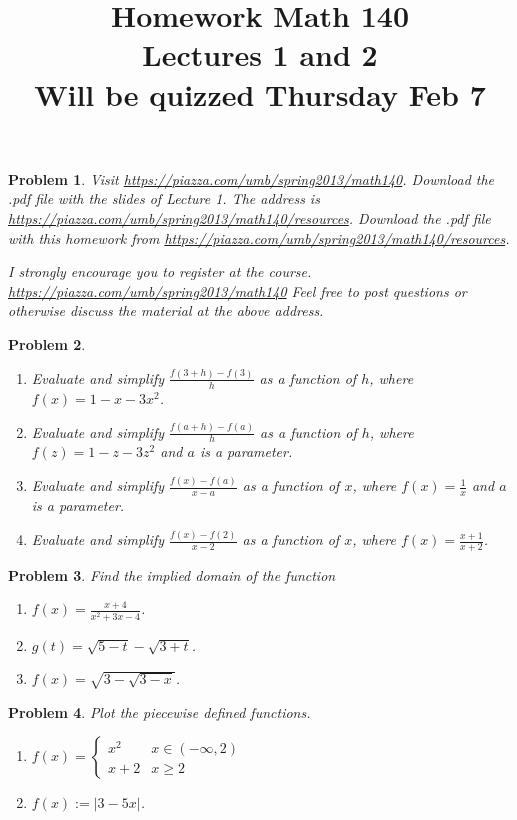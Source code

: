 \documentclass{article}
\date{}
\title{
Homework Math 140 \\
Lectures 1 and 2 \\
Will be quizzed Thursday Feb 7
}
\newcommand{\doublebrace}[4]{\left\{\begin{array}{ll} #1 & #2 \\#3 & #4  \end{array} \right.}
\newtheorem{problem}{Problem}
\begin{document}
\maketitle
\begin{problem}
Visit \url{https://piazza.com/umb/spring2013/math140}. Download the .pdf file with the slides of Lecture 1. The address is 
\url{https://piazza.com/umb/spring2013/math140/resources}. Download the .pdf file with this homework from 
\url{https://piazza.com/umb/spring2013/math140/resources}. 

I strongly encourage you to register at the course. 
\url{https://piazza.com/umb/spring2013/math140}
Feel free to post questions or otherwise discuss the material at the above address.
\end{problem}

\begin{problem}
\begin{enumerate}
\item Evaluate and simplify $\frac{f(3+h)-f(3)}{h}$ as a function of $h$, where $f(x)= 1-x-3x^2$. 
\item Evaluate and simplify $\frac{f(a+h)-f(a)}{h}$ as a function of $h$, where $f(z)= 1-z-3z^2$ and $a$ is a parameter.
\item Evaluate and simplify $\frac{f(x)-f(a)}{x-a}$ as a function of $x$, where $f(x)= \frac{1}{x}$ and $a$ is a parameter.
\item Evaluate and simplify $\frac{f(x)-f(2)}{x-2}$ as a function of $x$, where $f(x)= \frac{x+1}{x+2}$.
\end{enumerate}
\end{problem}
\begin{problem}Find the implied domain of the function 
\begin{enumerate}
\item $f(x)=\frac{x+4}{x^2+3x-4}$.
\item $g(t)=\sqrt{5-t}-\sqrt{3+t}$.
\item $f(x)=\sqrt{3-\sqrt{3-x}}$.
\end{enumerate}
\end{problem}
\begin{problem}
Plot the piecewise defined functions.
\begin{enumerate}
\item $f(x)=\doublebrace{x^2}{x\in (-\infty,2)}{x+2}{x\geq 2}$
\item $f(x):=|3-5x|$.
\end{enumerate}
\end{problem}
\end{document}

